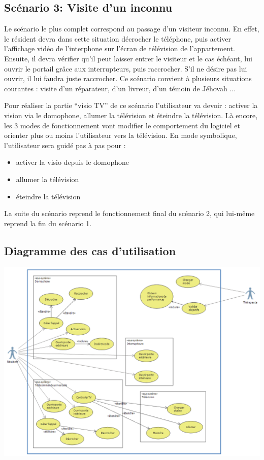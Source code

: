 \subsection{Scénario 3: Visite d'un inconnu}

Le scénario le plus complet correspond au passage d'un visiteur inconnu. En effet, le résident devra dans cette situation décrocher le téléphone, puis activer l'affichage vidéo de l'interphone sur l'écran de télévision de l'appartement. Ensuite, il devra vérifier qu'il peut laisser entrer le visiteur et le cas échéant, lui ouvrir le portail grâce aux interrupteurs, puis raccrocher. S'il ne désire pas lui ouvrir, il lui faudra juste raccrocher.
Ce scénario convient à plusieurs situations courantes : visite d'un réparateur, d'un livreur, d'un témoin de Jéhovah ...

Pour réaliser la partie "`visio TV"' de ce scénario l'utilisateur va devoir : activer la vision via le domophone, allumer la télévision et éteindre la télévision. Là encore, les 3 modes de fonctionnement vont modifier le comportement du logiciel et orienter plus ou moins l'utilisateur vers la télévision. En mode symbolique, l'utilisateur sera guidé pas à pas pour : 
\begin{itemize}
	\item activer la visio depuis le domophone
	\item allumer la télévision
	\item éteindre la télévision
\end{itemize}
La suite du scénario reprend le fonctionnement final du scénario 2, qui lui-même reprend la fin du scénario 1.

\subsection{Diagramme des cas d'utilisation}
\begin{center}
\includegraphics[scale=0.58]{1-PreEtude/img/diagramme}
\end{center}
